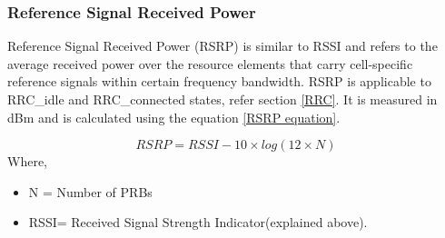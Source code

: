 \documentclass[12pt]{article}
\begin{document}
\begin{table}[H]
\caption {RSSI reference values for Sigfox \cite{sigfoxRSSI}}
\centering
{}
\label{sigfoxRSSI}
\end{table}


\subsubsection{Reference Signal Received Power}\label{rsrp}
Reference Signal Received Power (RSRP) is similar to RSSI and refers to the average received power over the resource elements that carry cell-specific reference signals within  certain  frequency  bandwidth. RSRP is applicable to RRC\_idle and RRC\_connected states, refer section \ref{RRC}. It is measured in dBm and is calculated using the equation \ref{RSRP equation}.

\begin{equation}
    RSRP = {{RSSI - 10\times log (12\times N) }}
    \label{RSRP equation}
\end{equation}
Where, 
\begin{itemize}
    \item N = Number of PRBs 
    \item RSSI= Received Signal Strength Indicator(explained above).
\end{itemize}
\end{document}
